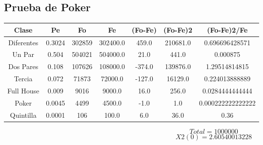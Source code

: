 \documentclass{article}
\begin{document}
\subsection{Prueba de Poker}
\begin{tabular}{|c|c|c|c|c|c|c|}
Clase&Pe&Fo&Fe&(Fo{-}Fe)&(Fo{-}Fe)2&(Fo{-}Fe)2/Fe\\
\hline
Diferentes&0.3024&302859&302400.0&459.0&210681.0&0.696696428571\\
\hline
Un Par&0.504&504021&504000.0&21.0&441.0&0.000875\\
\hline
Dos Pares&0.108&107626&108000.0&{-}374.0&139876.0&1.29514814815\\
\hline
Tercia&0.072&71873&72000.0&{-}127.0&16129.0&0.224013888889\\
\hline
Full House&0.009&9016&9000.0&16.0&256.0&0.0284444444444\\
\hline
Poker&0.0045&4499&4500.0&{-}1.0&1.0&0.000222222222222\\
\hline
Quintilla&0.0001&106&100.0&6.0&36.0&0.36\\
\end{tabular}
$$
Total = 1000000
$$
$$
X2(0) = 2.60540013228
$$
\end{document}
